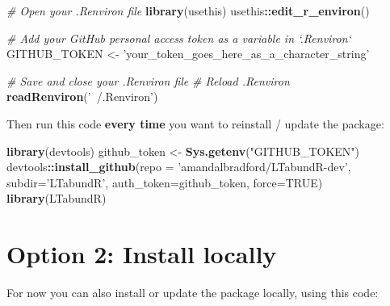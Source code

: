 \documentclass[
]{book}
\newenvironment{Shaded}{\begin{snugshade}}{\end{snugshade}}
\newcommand{\CommentTok}[1]{\textcolor[rgb]{0.56,0.35,0.01}{\textit{#1}}}
\newcommand{\DataTypeTok}[1]{\textcolor[rgb]{0.13,0.29,0.53}{#1}}
\newcommand{\KeywordTok}[1]{\textcolor[rgb]{0.13,0.29,0.53}{\textbf{#1}}}
\newcommand{\NormalTok}[1]{#1}
\newcommand{\OperatorTok}[1]{\textcolor[rgb]{0.81,0.36,0.00}{\textbf{#1}}}
\newcommand{\OtherTok}[1]{\textcolor[rgb]{0.56,0.35,0.01}{#1}}
\newcommand{\StringTok}[1]{\textcolor[rgb]{0.31,0.60,0.02}{#1}}
\begin{document}
\begin{Shaded}
\begin{Highlighting}[]
\CommentTok{# Open your .Renviron file}
\KeywordTok{library}\NormalTok{(usethis)}
\NormalTok{usethis}\OperatorTok{::}\KeywordTok{edit_r_environ}\NormalTok{()}

\CommentTok{# Add your GitHub personal access token as a variable in `.Renviron`}
\NormalTok{GITHUB_TOKEN <-}\StringTok{ 'your_token_goes_here_as_a_character_string'}

\CommentTok{# Save and close your .Renviron file}
\CommentTok{# Reload .Renviron}
\KeywordTok{readRenviron}\NormalTok{(}\StringTok{'~/.Renviron'}\NormalTok{)}
\end{Highlighting}
\end{Shaded}

Then run this code \textbf{every time} you want to reinstall / update the package:

\begin{Shaded}
\begin{Highlighting}[]
\KeywordTok{library}\NormalTok{(devtools)}
\NormalTok{github_token <-}\StringTok{ }\KeywordTok{Sys.getenv}\NormalTok{(}\StringTok{"GITHUB_TOKEN"}\NormalTok{)}
\NormalTok{devtools}\OperatorTok{::}\KeywordTok{install_github}\NormalTok{(}\DataTypeTok{repo =} \StringTok{'amandalbradford/LTabundR-dev'}\NormalTok{,}
                         \DataTypeTok{subdir=}\StringTok{'LTabundR'}\NormalTok{,}
                         \DataTypeTok{auth_token=}\NormalTok{github_token,}
                         \DataTypeTok{force=}\OtherTok{TRUE}\NormalTok{)}
\KeywordTok{library}\NormalTok{(LTabundR)}
\end{Highlighting}
\end{Shaded}

\hypertarget{option-2-install-locally}{%
\section*{Option 2: Install locally}\label{option-2-install-locally}}

For now you can also install or update the package locally, using this code:
\end{document}
